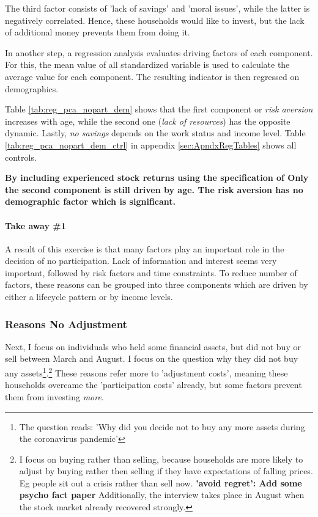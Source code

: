 \documentclass[ProjectABM]{subfiles}
\begin{document}
The third factor consists of 'lack of savings' and 'moral issues', while the latter is negatively correlated. Hence, these households would like to invest, but the lack of additional money prevents them from doing it.



In another step, a regression analysis evaluates driving factors of each component. For this, the mean value of all standardized variable is used to calculate the average value for each component. The resulting indicator is then regressed on demographics.

Table \ref{tab:reg_pca_nopart_dem} shows that the first component or \textit{risk aversion} increases with age, while the second one (\textit{lack of resources}) has the opposite dynamic. Lastly, \textit{no savings} depends on the work status and income level. Table \ref{tab:reg_pca_nopart_dem_ctrl} in appendix \ref{sec:ApndxRegTables} shows all controls.



\textbf{By including experienced stock returns using the specification of \cite{malmendier_2011} Only the second component is still driven by age. The risk aversion has no demographic factor which is significant.}

\paragraph{Take away \#1}
A result of this exercise is that many factors play an important role in the decision of no participation. Lack of information and interest seems very important, followed by risk factors and time constraints. To reduce number of factors, these reasons can be grouped into three components which are driven by either a lifecycle pattern or by income levels. %

\subsubsection{Reasons No Adjustment}
Next, I focus on individuals who held some financial assets, but did not buy or sell between March and August. I focus on the question why they did not buy any assets\footnote{The question reads: 'Why did you decide not to buy any more assets during the coronavirus pandemic'}.\footnote{I focus on buying rather than selling, because households are more likely to adjust by buying rather then selling if they have expectations of falling prices. Eg people sit out a crisis rather than sell now. \textbf{'avoid regret': Add some psycho fact paper} Additionally, the interview takes place in August when the stock market already recovered strongly. } These reasons refer more to 'adjustment costs', meaning these households overcame the 'participation costs' already, but some factors prevent them from investing \textit{more}.%
\end{document}
